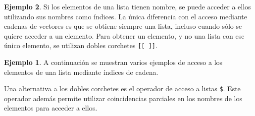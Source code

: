 \documentclass[
]{book}
\newenvironment{Shaded}{\begin{snugshade}}{\end{snugshade}}
\newcommand{\CommentTok}[1]{\textcolor[rgb]{0.56,0.35,0.01}{\textit{#1}}}
\newcommand{\DecValTok}[1]{\textcolor[rgb]{0.00,0.00,0.81}{#1}}
\newcommand{\FunctionTok}[1]{\textcolor[rgb]{0.00,0.00,0.00}{#1}}
\newcommand{\NormalTok}[1]{#1}
\newcommand{\OtherTok}[1]{\textcolor[rgb]{0.56,0.35,0.01}{#1}}
\newcommand{\StringTok}[1]{\textcolor[rgb]{0.31,0.60,0.02}{#1}}
\theoremstyle{definition}
\theoremstyle{definition}
\newtheorem{example}{Ejemplo}[chapter]
\theoremstyle{definition}
\theoremstyle{definition}
\theoremstyle{remark}
\begin{document}
\begin{example}
Si los elementos de una lista tienen nombre, se puede acceder a ellos utilizando sus nombres como índices. La única diferencia con el acceso mediante cadenas de vectores es que se obtiene siempre una lista, incluso cuando sólo se quiere acceder a un elemento. Para obtener un elemento, y no una lista con ese único elemento, se utilizan dobles corchetes \texttt{{[}{[}\ {]}{]}}.

\begin{example}

A continuación se muestran varios ejemplos de acceso a los elementos de una lista mediante índices de cadena.

\begin{Shaded}
\end{Shaded}

\end{example}

Una alternativa a los dobles corchetes es el operador de acceso a listas \texttt{\$}. Este operador además permite utilizar coincidencias parciales en los nombres de los elementos para acceder a ellos.


\end{example}
\end{document}
